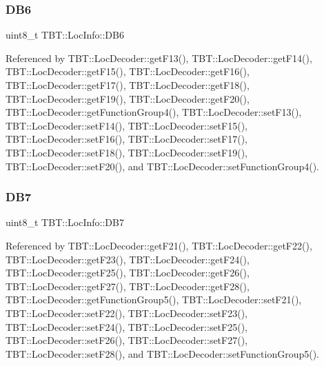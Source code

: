 \subsubsection{\texorpdfstring{D\+B6}{DB6}}
{\footnotesize\ttfamily uint8\+\_\+t T\+B\+T\+::\+Loc\+Info\+::\+D\+B6}



Referenced by T\+B\+T\+::\+Loc\+Decoder\+::get\+F13(), T\+B\+T\+::\+Loc\+Decoder\+::get\+F14(), T\+B\+T\+::\+Loc\+Decoder\+::get\+F15(), T\+B\+T\+::\+Loc\+Decoder\+::get\+F16(), T\+B\+T\+::\+Loc\+Decoder\+::get\+F17(), T\+B\+T\+::\+Loc\+Decoder\+::get\+F18(), T\+B\+T\+::\+Loc\+Decoder\+::get\+F19(), T\+B\+T\+::\+Loc\+Decoder\+::get\+F20(), T\+B\+T\+::\+Loc\+Decoder\+::get\+Function\+Group4(), T\+B\+T\+::\+Loc\+Decoder\+::set\+F13(), T\+B\+T\+::\+Loc\+Decoder\+::set\+F14(), T\+B\+T\+::\+Loc\+Decoder\+::set\+F15(), T\+B\+T\+::\+Loc\+Decoder\+::set\+F16(), T\+B\+T\+::\+Loc\+Decoder\+::set\+F17(), T\+B\+T\+::\+Loc\+Decoder\+::set\+F18(), T\+B\+T\+::\+Loc\+Decoder\+::set\+F19(), T\+B\+T\+::\+Loc\+Decoder\+::set\+F20(), and T\+B\+T\+::\+Loc\+Decoder\+::set\+Function\+Group4().

\mbox{\label{structTBT_1_1LocInfo_ada6908e13b58140fe9a127de250f893e_ada6908e13b58140fe9a127de250f893e}} 
\subsubsection{\texorpdfstring{D\+B7}{DB7}}
{\footnotesize\ttfamily uint8\+\_\+t T\+B\+T\+::\+Loc\+Info\+::\+D\+B7}



Referenced by T\+B\+T\+::\+Loc\+Decoder\+::get\+F21(), T\+B\+T\+::\+Loc\+Decoder\+::get\+F22(), T\+B\+T\+::\+Loc\+Decoder\+::get\+F23(), T\+B\+T\+::\+Loc\+Decoder\+::get\+F24(), T\+B\+T\+::\+Loc\+Decoder\+::get\+F25(), T\+B\+T\+::\+Loc\+Decoder\+::get\+F26(), T\+B\+T\+::\+Loc\+Decoder\+::get\+F27(), T\+B\+T\+::\+Loc\+Decoder\+::get\+F28(), T\+B\+T\+::\+Loc\+Decoder\+::get\+Function\+Group5(), T\+B\+T\+::\+Loc\+Decoder\+::set\+F21(), T\+B\+T\+::\+Loc\+Decoder\+::set\+F22(), T\+B\+T\+::\+Loc\+Decoder\+::set\+F23(), T\+B\+T\+::\+Loc\+Decoder\+::set\+F24(), T\+B\+T\+::\+Loc\+Decoder\+::set\+F25(), T\+B\+T\+::\+Loc\+Decoder\+::set\+F26(), T\+B\+T\+::\+Loc\+Decoder\+::set\+F27(), T\+B\+T\+::\+Loc\+Decoder\+::set\+F28(), and T\+B\+T\+::\+Loc\+Decoder\+::set\+Function\+Group5().

